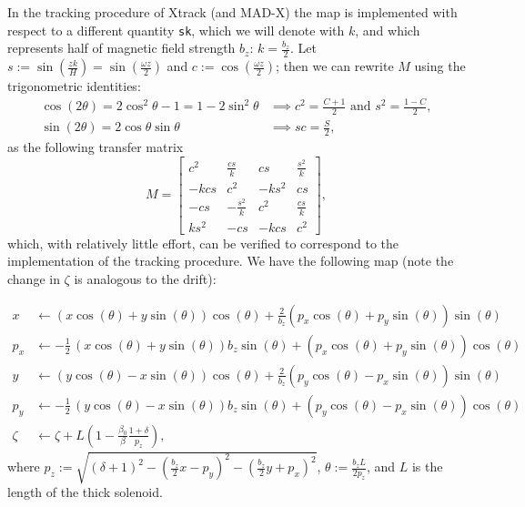 In the tracking procedure of Xtrack (and MAD-X) the map is implemented with respect to a different quantity \verb|sk|, which we will denote with $k$, and which represents half of magnetic field strength $b_z$: $k = \frac{b_z}{2}$.
Let $s := \sin(\frac{z k}{H}) = \sin(\frac{\omega z}{2})$ and $c := \cos(\frac{\omega z}{2})$; then we can rewrite $M$ using the trigonometric identities:
\begin{align*}
  \cos(2 \theta) = 2 \cos^2\theta - 1 = 1 - 2 \sin^2\theta &\implies c^2 = \frac{C + 1}{2} \text{ and } s^2 = \frac{1 - C}{2}, \\
  \sin(2 \theta) = 2 \cos\theta \sin\theta &\implies sc = \frac{S}{2},
\end{align*}
as the following transfer matrix
\[
  M = \begin{bmatrix}
    c^2 & \frac{cs}{k} & cs & \frac{s^2}{k} \\
    -kcs & c^2 & -ks^2 & cs \\
    -cs & -\frac{s^2}{k} & c^2 & \frac{cs}{k} \\
    ks^2 & -cs & -kcs & c^2
  \end{bmatrix},
\]
which, with relatively little effort, can be verified to correspond to the implementation of the tracking procedure.
We have the following map (note the change in $\zeta$ is analogous to the drift):

\begin{align*}
  x &\leftarrow {\left(x \cos\left(\theta\right) + y \sin\left(\theta\right)\right)} \cos\left(\theta\right) + \frac{2}{b_{z}} {\left(p_{x} \cos\left(\theta\right) + p_{y} \sin\left(\theta\right)\right)} \sin\left(\theta\right) \\
  p_x &\leftarrow -\frac{1}{2} \, {\left(x \cos\left(\theta\right) + y \sin\left(\theta\right)\right)} b_{z} \sin\left(\theta\right) + {\left(p_{x} \cos\left(\theta\right) + p_{y} \sin\left(\theta\right)\right)} \cos\left(\theta\right) \\
  y &\leftarrow {\left(y \cos\left(\theta\right) - x \sin\left(\theta\right)\right)} \cos\left(\theta\right) + \frac{2}{b_{z}} {\left(p_{y} \cos\left(\theta\right) - p_{x} \sin\left(\theta\right)\right)} \sin\left(\theta\right) \\
  p_y &\leftarrow -\frac{1}{2} \, {\left(y \cos\left(\theta\right) - x \sin\left(\theta\right)\right)} b_{z} \sin\left(\theta\right) + {\left(p_{y} \cos\left(\theta\right) - p_{x} \sin\left(\theta\right)\right)} \cos\left(\theta\right) \\
  \zeta &\leftarrow \zeta + L \left(1 - \frac{\beta_0}{\beta} \frac{1 + \delta}{p_z}\right),
\end{align*}
where $p_z :=  \sqrt{{\left(\delta + 1\right)}^2 - {\left(\frac{b_z}{2} x - p_{y}\right)}^{2} - {\left(\frac{b_{z}}{2} y + p_{x}\right)}^{2}}$, $\theta := \frac{b_{z} L}{2 p_z} $, and $L$ is the length of the thick solenoid.


